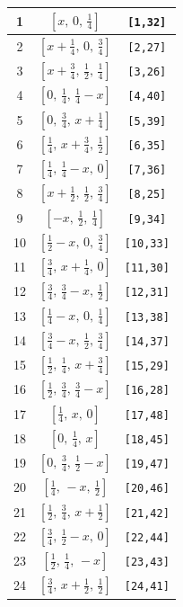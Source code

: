 \documentclass[fleqn,8pt]{jsarticle}
\begin{document}
\begin{longtable}{ccc}
1 & $\left[ x,\, 0,\, \frac{1}{4} \right]$ & {\tt [1,32]} \\ \hline
2 & $\left[ x + \frac{1}{4},\, 0,\, \frac{3}{4} \right]$ & {\tt [2,27]} \\ \hline
3 & $\left[ x + \frac{3}{4},\, \frac{1}{2},\, \frac{1}{4} \right]$ & {\tt [3,26]} \\ \hline
4 & $\left[ 0,\, \frac{1}{4},\, \frac{1}{4} - x \right]$ & {\tt [4,40]} \\ \hline
5 & $\left[ 0,\, \frac{3}{4},\, x + \frac{1}{4} \right]$ & {\tt [5,39]} \\ \hline
6 & $\left[ \frac{1}{4},\, x + \frac{3}{4},\, \frac{1}{2} \right]$ & {\tt [6,35]} \\ \hline
7 & $\left[ \frac{1}{4},\, \frac{1}{4} - x,\, 0 \right]$ & {\tt [7,36]} \\ \hline
8 & $\left[ x + \frac{1}{2},\, \frac{1}{2},\, \frac{3}{4} \right]$ & {\tt [8,25]} \\ \hline
9 & $\left[ - x,\, \frac{1}{2},\, \frac{1}{4} \right]$ & {\tt [9,34]} \\ \hline
10 & $\left[ \frac{1}{2} - x,\, 0,\, \frac{3}{4} \right]$ & {\tt [10,33]} \\ \hline
11 & $\left[ \frac{3}{4},\, x + \frac{1}{4},\, 0 \right]$ & {\tt [11,30]} \\ \hline
12 & $\left[ \frac{3}{4},\, \frac{3}{4} - x,\, \frac{1}{2} \right]$ & {\tt [12,31]} \\ \hline
13 & $\left[ \frac{1}{4} - x,\, 0,\, \frac{1}{4} \right]$ & {\tt [13,38]} \\ \hline
14 & $\left[ \frac{3}{4} - x,\, \frac{1}{2},\, \frac{3}{4} \right]$ & {\tt [14,37]} \\ \hline
15 & $\left[ \frac{1}{2},\, \frac{1}{4},\, x + \frac{3}{4} \right]$ & {\tt [15,29]} \\ \hline
16 & $\left[ \frac{1}{2},\, \frac{3}{4},\, \frac{3}{4} - x \right]$ & {\tt [16,28]} \\ \hline
17 & $\left[ \frac{1}{4},\, x,\, 0 \right]$ & {\tt [17,48]} \\ \hline
18 & $\left[ 0,\, \frac{1}{4},\, x \right]$ & {\tt [18,45]} \\ \hline
19 & $\left[ 0,\, \frac{3}{4},\, \frac{1}{2} - x \right]$ & {\tt [19,47]} \\ \hline
20 & $\left[ \frac{1}{4},\, - x,\, \frac{1}{2} \right]$ & {\tt [20,46]} \\ \hline
21 & $\left[ \frac{1}{2},\, \frac{3}{4},\, x + \frac{1}{2} \right]$ & {\tt [21,42]} \\ \hline
22 & $\left[ \frac{3}{4},\, \frac{1}{2} - x,\, 0 \right]$ & {\tt [22,44]} \\ \hline
23 & $\left[ \frac{1}{2},\, \frac{1}{4},\, - x \right]$ & {\tt [23,43]} \\ \hline
24 & $\left[ \frac{3}{4},\, x + \frac{1}{2},\, \frac{1}{2} \right]$ & {\tt [24,41]} \\
\end{longtable}
\end{document}
